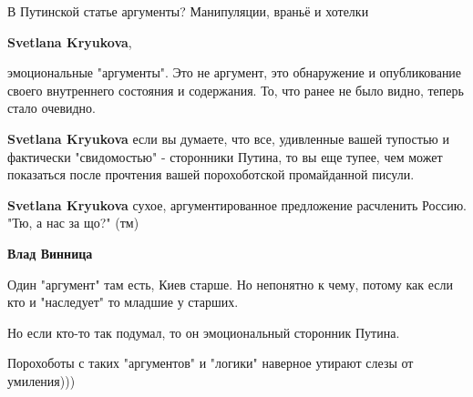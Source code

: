 \begin{itemize}
\begin{itemize}
В Путинской статье аргументы? Манипуляции, враньё и хотелки

 
\textbf{Svetlana Kryukova}, 

эмоциональные "аргументы". Это не аргумент, это обнаружение и опубликование
своего внутреннего состояния и содержания. То, что ранее не было видно, теперь
стало очевидно.

 
\textbf{Svetlana Kryukova} если вы думаете, что все, удивленные вашей тупостью и фактически "свидомостью" - сторонники Путина, то вы еще тупее, чем может показаться после прочтения вашей порохоботской промайданной писули.

 
\textbf{Svetlana Kryukova} сухое, аргументированное предложение расчленить Россию.
"Тю, а нас за що?" (тм)

 
\textbf{Влад Винница} 

Один "аргумент" там есть, Киев старше. Но непонятно к чему, потому как если кто
и "наследует" то младшие у старших.

Но если кто-то так подумал, то он эмоциональный сторонник Путина.

Порохоботы с таких "аргументов" и "логики" наверное утирают слезы от
умиления)))

 

\end{itemize}
\end{itemize}
